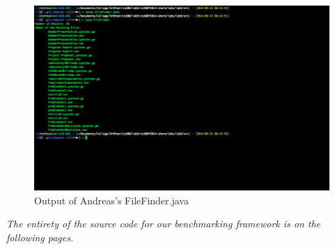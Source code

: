 \begin{enumerate}
		\begin{figure}[h!]                                                              
			\centerline{\includegraphics[scale=0.25]{../pic/Andreas.png}}                       
			\caption{Output of Andreas's FileFinder.java}                                         
		\end{figure}          
		\newpage                                                                
		\textit{The entirety of the source code for our benchmarking framework is on the following pages.}

		\vspace{5in}
		 
		\newpage                                                                
		 
		\newpage                                                                
		 
		\newpage                                                                
		 
		\newpage                                                                
		 
		\newpage                                                                
\end{enumerate}

